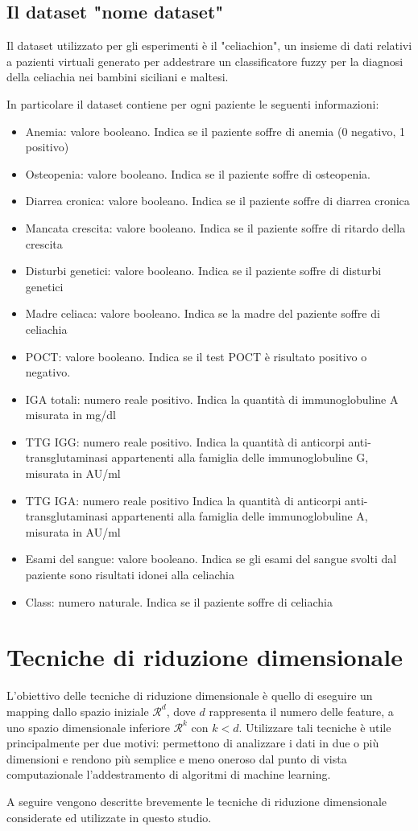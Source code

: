 \documentclass[11pt,a4paper,twocolumn]{article}
\begin{document}
\subsection{Il dataset "nome dataset"}
Il dataset utilizzato per gli esperimenti è il "celiachion", un insieme di dati relativi a pazienti virtuali generato per addestrare un classificatore fuzzy per la diagnosi della celiachia nei bambini siciliani e maltesi.\par
In particolare il dataset contiene per ogni paziente le seguenti informazioni:
\begin{itemize}
	\item Anemia: valore booleano. Indica se il paziente soffre di anemia (0 negativo, 1 positivo)
	\item Osteopenia: valore booleano. Indica se il paziente soffre di osteopenia.
	\item Diarrea cronica: valore booleano. Indica se il paziente soffre di diarrea cronica
	\item Mancata crescita: valore booleano. Indica se il paziente soffre di ritardo della crescita
	\item Disturbi genetici: valore booleano. Indica se il paziente soffre di disturbi genetici
	\item Madre celiaca: valore booleano. Indica se la madre del paziente soffre di celiachia
	\item POCT: valore booleano. Indica se il test POCT è risultato positivo o negativo.
	\item IGA totali: numero reale positivo. Indica la quantità di immunoglobuline A misurata in mg/dl
	\item TTG IGG: numero reale positivo. Indica la quantità di anticorpi anti-transglutaminasi appartenenti alla famiglia delle immunoglobuline G, misurata in AU/ml
	\item TTG IGA: numero reale positivo Indica la quantità di anticorpi anti-transglutaminasi appartenenti alla famiglia delle immunoglobuline A, misurata in AU/ml
	\item Esami del sangue: valore booleano. Indica se gli esami del sangue svolti dal paziente sono risultati idonei alla celiachia
	\item Class: numero naturale. Indica se il paziente soffre di celiachia
\end{itemize}
\section{Tecniche di riduzione dimensionale}
L'obiettivo delle tecniche di riduzione dimensionale è quello di eseguire un mapping dallo spazio iniziale $ \mathcal{R}^d$, dove $ d $ rappresenta il numero delle feature, a uno spazio dimensionale inferiore  $ \mathcal{R}^k$ con $ k<d $. Utilizzare tali tecniche è utile principalmente per due motivi: permettono di analizzare i dati in due o più dimensioni e rendono più semplice e meno oneroso dal punto di vista computazionale l'addestramento di algoritmi di machine learning. \par
A seguire vengono descritte brevemente le tecniche di riduzione dimensionale considerate ed utilizzate in questo studio.
\end{document}
